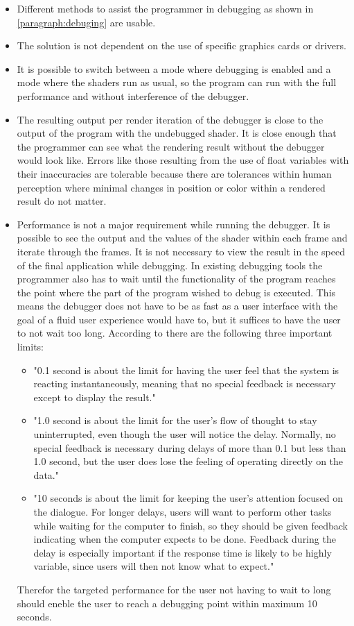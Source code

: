 \begin{itemize}
	\item Different methods to assist the programmer in debugging as shown in \autoref{paragraph:debuging} are usable.
	\item The solution is not dependent on the use of specific graphics cards or drivers.
	\item It is possible to switch between a mode where debugging is enabled and a mode where the shaders run as usual, so the program can run with the full performance and without interference of the debugger.
	\item The resulting output per render iteration of the debugger is close to the output of the program with the undebugged shader. It is close enough that the programmer can see what the rendering result without the debugger would look like. Errors like those resulting from the use of float variables with their inaccuracies are tolerable because there are tolerances within human perception where minimal changes in position or color within a rendered result do not matter.
	\item Performance is not a major requirement while running the debugger. It is possible to see the output and the values of the shader within each frame and iterate through the frames. It is not necessary to view the result in the speed of the final application while debugging. In existing debugging tools the programmer also has to wait until the functionality of the program reaches the point where the part of the program wished to debug is executed. This means the debugger does not have to be as fast as a user interface with the goal of a fluid user experience would have to, but it suffices to have the user to not wait too long. According to  there are the following three important limits:
	\begin{itemize}
	\item "0.1 second is about the limit for having the user feel that the system is reacting instantaneously, meaning that no special feedback is necessary except to display the result."
	\item "1.0 second is about the limit for the user's flow of thought to stay uninterrupted, even though the user will notice the delay. Normally, no special feedback is necessary during delays of more than 0.1 but less than 1.0 second, but the user does lose the feeling of operating directly on the data."
    \item "10 seconds is about the limit for keeping the user's attention focused on the dialogue. For longer delays, users will want to perform other tasks while waiting for the computer to finish, so they should be given feedback indicating when the computer expects to be done. Feedback during the delay is especially important if the response time is likely to be highly variable, since users will then not know what to expect."
	\end{itemize}
	Therefor the targeted performance for the user not having to wait to long should eneble the user to reach a debugging point within maximum 10 seconds.
\end{itemize}




